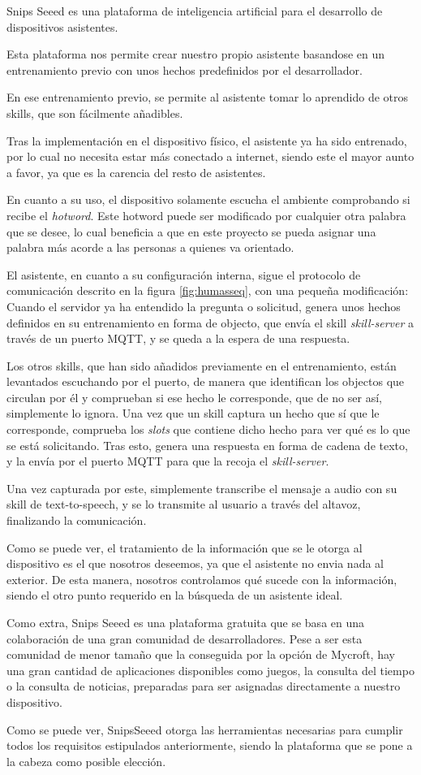 Snips Seeed es una  plataforma de inteligencia artificial para el desarrollo de dispositivos asistentes.

Esta plataforma nos permite crear nuestro propio asistente basandose en un entrenamiento previo con unos hechos predefinidos por el desarrollador.

En ese entrenamiento previo, se permite al asistente tomar lo aprendido de otros skills, que son fácilmente añadibles.

Tras la implementación en el dispositivo físico, el asistente ya ha sido entrenado, por lo cual no necesita estar más conectado a internet, siendo este el mayor aunto a favor, ya que es la carencia del resto de asistentes.

En cuanto a su uso, el dispositivo solamente escucha el ambiente comprobando si recibe el \textit{hotword}. Este hotword puede ser modificado por cualquier otra palabra que se desee, lo cual beneficia a que en este proyecto se pueda asignar una palabra más acorde a las personas a quienes va orientado.

El asistente, en cuanto a su configuración interna, sigue el protocolo de comunicación descrito en la figura \ref{fig:humasseq}, con una pequeña modificación:
Cuando el servidor ya ha entendido la pregunta o solicitud, genera unos hechos definidos en su entrenamiento en forma de objecto, que envía el skill \textit{skill-server} a través de un puerto MQTT, y se queda a la espera de una respuesta.

Los otros skills, que han sido añadidos previamente en el entrenamiento, están levantados escuchando por el puerto, de manera que identifican los objectos que circulan por él y comprueban si ese hecho le corresponde, que de no ser así, simplemente lo ignora.
Una vez que un skill captura un hecho que sí que le corresponde, comprueba los \textit{slots} que contiene dicho hecho para ver qué es lo que se está solicitando. Tras esto, genera una respuesta en forma de cadena de texto, y la envía por el puerto MQTT para que la recoja el \textit{skill-server}.

Una vez capturada por este, simplemente transcribe el mensaje a audio con su skill de text-to-speech, y se lo transmite al usuario a través del altavoz, finalizando la comunicación.

Como se puede ver, el tratamiento de la información que se le otorga al dispositivo es el que nosotros deseemos, ya que el asistente no envia nada al exterior. De esta manera, nosotros controlamos qué sucede con la información, siendo el otro punto requerido en la búsqueda de un asistente ideal.

Como extra, Snips Seeed es una plataforma gratuita que se basa en una colaboración de una gran comunidad de desarrolladores. Pese a ser esta comunidad de menor tamaño que la conseguida por la opción de Mycroft, hay una gran cantidad de aplicaciones disponibles como juegos, la consulta del tiempo o la consulta de noticias, preparadas para ser asignadas directamente a nuestro dispositivo.

Como se puede ver, SnipsSeeed otorga las herramientas necesarias para cumplir todos los requisitos estipulados anteriormente, siendo la plataforma que se pone a la cabeza como posible elección.
